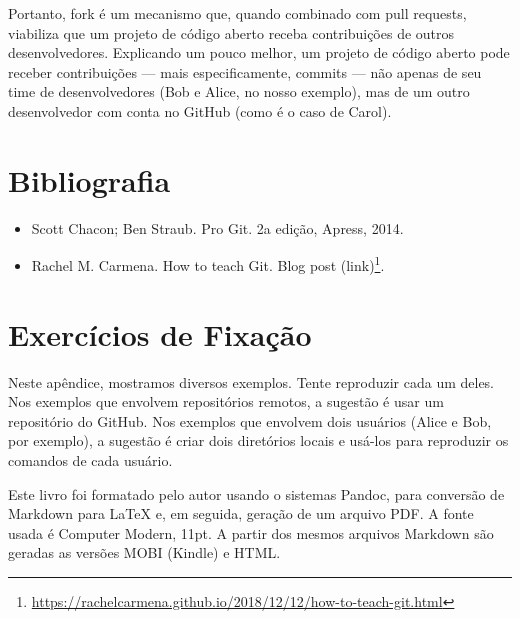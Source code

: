 \documentclass[
  11pt,
  twoside]{book}
\DeclareRobustCommand{\href}[2]{#2\footnote{\url{#1}}}
\begin{document}
Portanto, fork é um mecanismo que, quando combinado com pull requests,
viabiliza que um projeto de código aberto receba contribuições de outros
desenvolvedores. Explicando um pouco melhor, um projeto de código aberto
pode receber contribuições --- mais especificamente, commits --- não
apenas de seu time de desenvolvedores (Bob e Alice, no nosso exemplo),
mas de um outro desenvolvedor com conta no GitHub (como é o caso de
Carol).

\hypertarget{bibliografia-10}{%
\section*{Bibliografia}\label{bibliografia-10}}

\begin{itemize}
\item
  Scott Chacon; Ben Straub. Pro Git. 2a edição, Apress, 2014.
\item
  Rachel M. Carmena. How to teach Git. Blog post
  \href{https://rachelcarmena.github.io/2018/12/12/how-to-teach-git.html}{(link)}.
\end{itemize}

\hypertarget{exercuxedcios-de-fixauxe7uxe3o-10}{%
\section*{Exercícios de
Fixação}\label{exercuxedcios-de-fixauxe7uxe3o-10}}

Neste apêndice, mostramos diversos exemplos. Tente reproduzir cada um
deles. Nos exemplos que envolvem repositórios remotos, a sugestão é usar
um repositório do GitHub. Nos exemplos que envolvem dois usuários (Alice
e Bob, por exemplo), a sugestão é criar dois diretórios locais e usá-los
para reproduzir os comandos de cada usuário.

\small
\printindex

\clearpage
\thispagestyle{empty}
\vspace*{\fill}

Este livro foi formatado pelo autor usando o sistemas Pandoc, para
conversão de Markdown para LaTeX e, em seguida, geração de um arquivo
PDF. A fonte usada é Computer Modern, 11pt. A partir dos mesmos arquivos
Markdown são geradas as versões MOBI (Kindle) e HTML.

\backmatter
\end{document}
